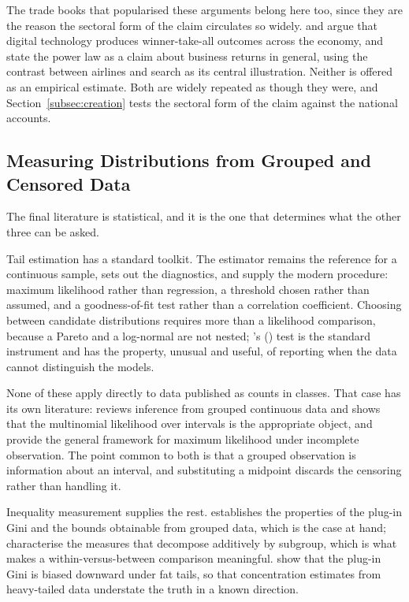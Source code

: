 \documentclass[jrfm,article,submit,pdftex,moreauthors]{Definitions/mdpi}
\begin{document}
The trade books that popularised these arguments belong here too, since they are the reason
the sectoral form of the claim circulates so widely. \citet{BrynjolfssonMcAfee2014} and
\citet{McAfeeBrynjolfsson2017} argue that digital technology produces winner-take-all
outcomes across the economy, and \citet{ThielMasters2014} state the power law as a claim
about business returns in general, using the contrast between airlines and search as its
central illustration. Neither is offered as an empirical estimate. Both are widely repeated
as though they were, and Section~\ref{subsec:creation} tests the sectoral form of the claim
against the national accounts.

\subsection{Measuring Distributions from Grouped and Censored Data}
\label{subsec:lit_measurement}

The final literature is statistical, and it is the one that determines what the other three
can be asked.

Tail estimation has a standard toolkit. The \citet{Hill1975} estimator remains the reference
for a continuous sample, \citet{Newman2005} sets out the diagnostics, and
\citet{ClausetShaliziNewman2009} supply the modern procedure: maximum likelihood rather than
regression, a threshold chosen rather than assumed, and a goodness-of-fit test rather than a
correlation coefficient. Choosing between candidate distributions requires more than a
likelihood comparison, because a Pareto and a log-normal are not nested;
\citeauthor{Vuong1989}'s (\citeyear{Vuong1989}) test is the standard instrument and has the
property, unusual and useful, of reporting when the data cannot distinguish the models.

None of these apply directly to data published as counts in classes. That case has its own
literature: \citet{Heitjan1989} reviews inference from grouped continuous data and shows
that the multinomial likelihood over intervals is the appropriate object, and
\citet{DempsterLairdRubin1977} provide the general framework for maximum likelihood under
incomplete observation. The point common to both is that a grouped observation is
information about an interval, and substituting a midpoint discards the censoring rather
than handling it.

Inequality measurement supplies the rest. \citet{Gastwirth1972} establishes the properties
of the plug-in Gini and the bounds obtainable from grouped data, which is the case at hand;
\citet{Shorrocks1980, Shorrocks1984} characterise the measures that decompose additively by
subgroup, which is what makes a within-versus-between comparison meaningful.
\citet{FontanariTalebCirillo2018} show that the plug-in Gini is biased downward under fat
tails, so that concentration estimates from heavy-tailed data understate the truth in a known
direction.
\end{document}
